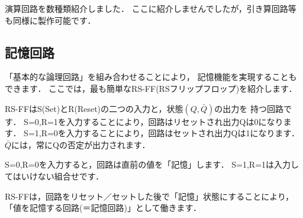演算回路を数種類紹介しました．
ここに紹介しませんでしたが，引き算回路等も同様に製作可能です．

\subsection{記憶回路}
「基本的な論理回路」を組み合わせることにより，
記憶機能を実現することもできます．
ここでは，最も簡単なRS-FF(RSフリップフロップ)を紹介します．

RS-FFはS(Set)とR(Reset)の二つの入力と，状態$(Q,\bar Q)$の出力を
持つ回路です．
S=0,R=1を入力することにより，回路はリセットされ出力Qは0になります．
S=1,R=0を入力することにより，回路はセットされ出力Qは1になります．
\( \bar Q \)には，常にQの否定が出力されます．

S=0,R=0を入力すると，回路は直前の値を「記憶」します．
S=1,R=1は入力してはいけない組合せです．

RS-FFは，回路をリセット／セットした後で「記憶」状態にすることにより，
「値を記憶する回路(＝記憶回路)」として働きます．

\vspace{0.2cm}

\vspace{0.3cm}

